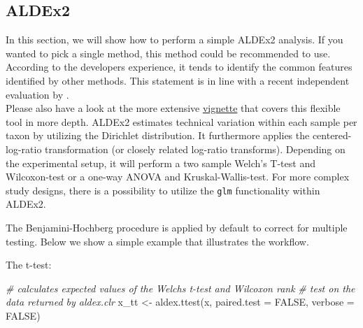 \documentclass[
]{book}
\newenvironment{Shaded}{\begin{snugshade}}{\end{snugshade}}
\newcommand{\AttributeTok}[1]{\textcolor[rgb]{0.77,0.63,0.00}{#1}}
\newcommand{\CommentTok}[1]{\textcolor[rgb]{0.56,0.35,0.01}{\textit{#1}}}
\newcommand{\ConstantTok}[1]{\textcolor[rgb]{0.00,0.00,0.00}{#1}}
\newcommand{\DecValTok}[1]{\textcolor[rgb]{0.00,0.00,0.81}{#1}}
\newcommand{\FunctionTok}[1]{\textcolor[rgb]{0.00,0.00,0.00}{#1}}
\newcommand{\NormalTok}[1]{#1}
\newcommand{\OtherTok}[1]{\textcolor[rgb]{0.56,0.35,0.01}{#1}}
\newcommand{\SpecialCharTok}[1]{\textcolor[rgb]{0.00,0.00,0.00}{#1}}
\begin{document}
\hypertarget{aldex2}{%
\subsection{ALDEx2}\label{aldex2}}

In this section, we will show how to perform a simple ALDEx2 analysis.
If you wanted to pick a single method, this method could be recommended to use.
According to the developers experience, it tends to identify the common
features identified by other methods. This statement is in line with a recent
independent evaluation by \citet{Nearing2022}.\\
Please also have a look at the more extensive
\href{https://bioconductor.org/packages/release/bioc/vignettes/ALDEx2/inst/doc/ALDEx2_vignette.html}{vignette}
that covers this flexible tool in more depth. ALDEx2 estimates technical
variation within each sample per taxon by utilizing the Dirichlet distribution.
It furthermore applies the centered-log-ratio transformation (or closely
related log-ratio transforms). Depending on the experimental setup, it will
perform a two sample Welch's T-test and Wilcoxon-test or a one-way ANOVA and
Kruskal-Wallis-test. For more complex study designs, there is a possibility to
utilize the \texttt{glm} functionality within ALDEx2.

The Benjamini-Hochberg procedure is applied by default to correct for
multiple testing. Below we show a simple example that illustrates the
workflow.

\begin{Shaded}
\end{Shaded}

The t-test:

\begin{Shaded}
\begin{Highlighting}[]
\CommentTok{\# calculates expected values of the Welch\textquotesingle{}s t{-}test and Wilcoxon rank}
\CommentTok{\# test on the data returned by aldex.clr}
\NormalTok{x\_tt }\OtherTok{\textless{}{-}} \FunctionTok{aldex.ttest}\NormalTok{(x, }\AttributeTok{paired.test =} \ConstantTok{FALSE}\NormalTok{, }\AttributeTok{verbose =} \ConstantTok{FALSE}\NormalTok{)}
\end{Highlighting}
\end{Shaded}
\end{document}
